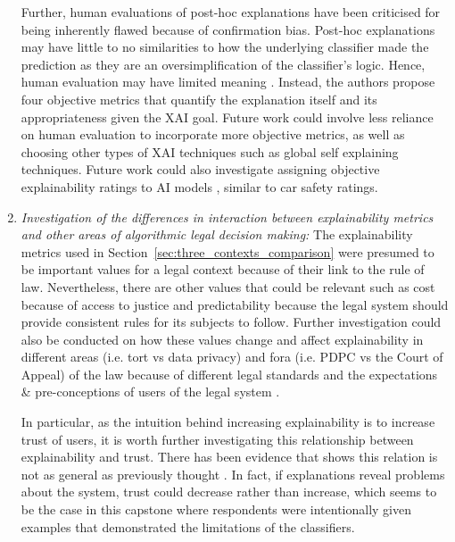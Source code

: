 \begin{enumerate}
    Further, human evaluations of post-hoc explanations have been criticised for being inherently flawed because of confirmation bias. Post-hoc explanations may have little to no similarities to how the underlying classifier made the prediction as they are an oversimplification of the classifier's logic. Hence, human evaluation may have limited meaning \cite{rosenfeld2021}. Instead, the authors propose four objective metrics that quantify the explanation itself and its appropriateness given the XAI goal. Future work could involve less reliance on human evaluation to incorporate more objective metrics, as well as choosing other types of XAI techniques such as global self explaining techniques. Future work could also investigate assigning objective explainability ratings to AI models \cite{waltl2018}, similar to car safety ratings.

    \item \textit{Investigation of the differences in interaction between explainability metrics and other areas of algorithmic legal decision making:} The explainability metrics used in Section~\ref{sec:three_contexts_comparison} were presumed to be important values for a legal context because of their link to the rule of law. Nevertheless, there are other values that could be relevant such as cost because of access to justice and predictability because the legal system should provide consistent rules for its subjects to follow. Further investigation could also be conducted on how these values change and affect explainability in different areas (i.e. tort vs data privacy) and fora (i.e. PDPC vs the Court of Appeal) of the law because of different legal standards \cite{hacker2022varieties} and the expectations \& pre-conceptions of users of the legal system \cite{yalcin2022perceptions}.
    
    In particular, as the intuition behind increasing explainability is to increase trust of users, it is worth further investigating this relationship between explainability and trust. There has been evidence that shows this relation is not as general as previously thought \cite{kastner2021}. In fact, if explanations reveal problems about the system, trust could decrease rather than increase, which seems to be the case in this capstone where respondents were intentionally given examples that demonstrated the limitations of the classifiers.
\end{enumerate}

